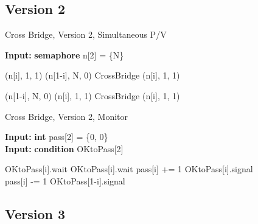 \documentclass{article}
\renewcommand{\algorithmicrequire}{\textbf{Input: }}
\begin{document}
\subsection{Version 2}

\begin{algorithm}[H]
  \caption{Cross Bridge, Version 2, Simultaneous P/V}
  \algorithmicrequire \textbf{semaphore} n[2] = \{N\} 

  \begin{algorithmic}
      \State \SP(n[i], 1, 1)
      \State \SP(n[1-i], N, 0)
      \State CrossBridge
      \State \SV(n[i], 1, 1)
    \EndProcedure

      \State \SP(n[1-i], N, 0)
      \State \SP(n[i], 1, 1)
      \State CrossBridge
      \State \SV(n[i], 1, 1)
    \EndProcedure
  \end{algorithmic}
\end{algorithm}


\begin{algorithm}[H]
  \caption{Cross Bridge, Version 2, Monitor}
  \algorithmicrequire \textbf{int} pass[2] = \{0, 0\} \\
  \algorithmicrequire \textbf{condition} OKtoPass[2] \\

  \begin{algorithmic}
        \State OKtoPass[i].wait
      \EndIf
        \State OKtoPass[i].wait
      \EndIf
      \State pass[i] += 1
      \State OKtoPass[i].signal
    \EndProcedure
    \\
      \State pass[i] -= 1
        \State OKtoPass[1-i].signal
      \EndIf
    \EndProcedure
  \end{algorithmic}
\end{algorithm}

\subsection{Version 3}
\end{document}
